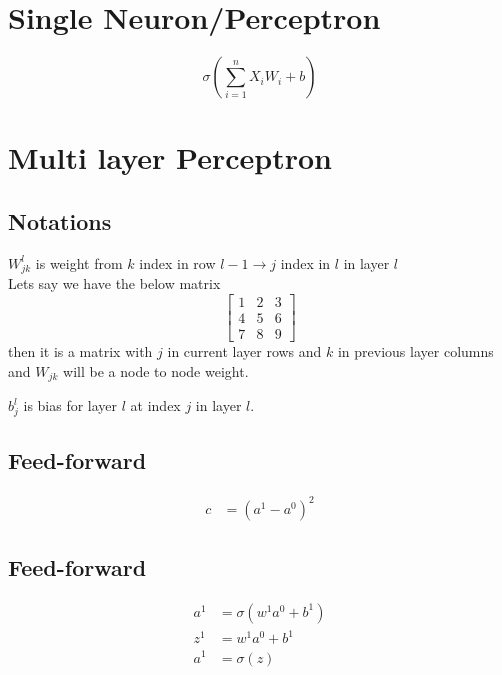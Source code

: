 \documentclass{article}
\begin{document}
\section{Single Neuron/Perceptron}

\begin{equation}
  \sigma\left(\sum_{i=1}^{n} X_{i}W_{i} + b\right)
\end{equation}

\section{Multi layer Perceptron}
\subsection{Notations}
$W_{jk}^{l}$ is weight from $k$ index in row $l - 1 \rightarrow j$ index in $l$ in layer $l$ \\
Lets say we have the below matrix
$$
\begin{bmatrix}
  1 & 2 & 3 \\
  4 & 5 & 6 \\
  7 & 8 & 9 
\end{bmatrix}
$$
then it is a matrix with $j$ in current layer rows and $k$ in previous layer columns and $W_{jk}$ will be a node to node weight.

$b_{j}^{l}$ is bias for layer $l$ at index $j$ in layer $l$.

\subsection{Feed-forward}
\begin{align}
  c &= (a^{1} - a^{0})^{2}
\end{align}

\subsection{Feed-forward}

\begin{align}
  a^{1} &= \sigma(w^{1}a^{0} + b^{1}) \\
  z^{1} &= w^{1}a^{0} + b^{1} \\
  a^{1} &= \sigma(z)
\end{align}
\end{document}
